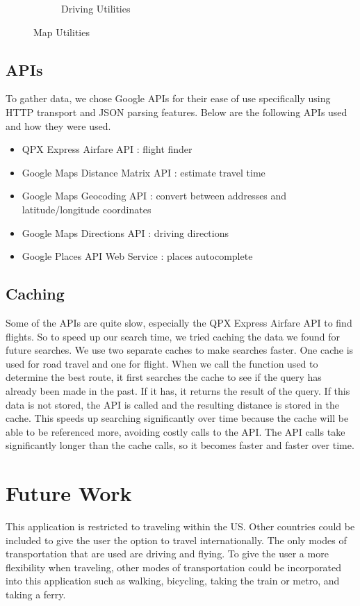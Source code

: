 \documentclass[11pt]{article}
\begin{document}
\begin{figure}
\begin{subfigure}{.6\textwidth}
  \caption{Driving Utilities}
  \label{fig:drivuml}
\end{subfigure}
\caption{Map Utilities}
\label{fig:util}
\end{figure}

\pagebreak

\subsection{APIs}

To gather data, we chose Google APIs for their ease of use specifically using HTTP transport and JSON parsing features. 
Below are the following APIs used and how they were used.

\begin{itemize}
\item QPX Express Airfare API : flight finder
\item Google Maps Distance Matrix API : estimate travel time
\item Google Maps Geocoding API : convert between addresses and latitude/longitude coordinates
\item Google Maps Directions API : driving directions
\item Google Places API Web Service : places autocomplete
\end{itemize}

\subsection{Caching}

Some of the APIs are quite slow, especially the QPX Express Airfare API to find flights. So to speed up our search time, we tried caching the data we found for future searches.
We use two separate caches to make searches faster. One cache is used for road travel and one for flight. When we call the function used to determine the best route, it first searches the cache to see if the query has already been made in the past. If it has, it returns the result of the query. If this data is not stored, the API is called and the resulting distance is stored in the cache. This speeds up searching significantly over time because the cache will be able to be referenced more, avoiding costly calls to the API. The API calls take significantly longer than the cache calls, so it becomes faster and faster over time. 

\section{Future Work}
This application is restricted to traveling within the US. Other countries could be included to give the user the option to travel internationally. The only modes of transportation that are used are driving and flying. To give the user a more flexibility when traveling, other modes of transportation could be incorporated into this application such as walking, bicycling, taking the train or metro, and taking a ferry.
\end{document}
